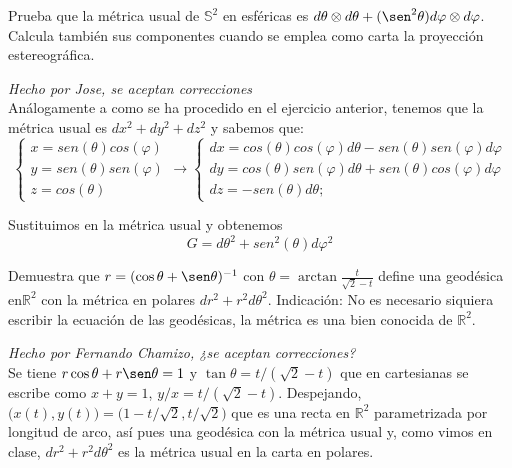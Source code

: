 \begin{problem}[9] Prueba que la métrica usual de $\mathbb{S}^2$ en esféricas es 
	$
	d\theta\otimes d\theta+(\sen^2\theta) d\varphi\otimes d\varphi
	$.
	Calcula también sus componentes cuando se emplea como carta la proyección estereográfica.
	
	
	\solution\textit{Hecho por Jose, se aceptan correcciones}\\ Análogamente a como se ha procedido en el ejercicio anterior, tenemos que la métrica usual es $dx^2+dy^2+dz^2$ y sabemos que: $$\begin{cases}x=sen(\theta)cos(\varphi)\\y=sen(\theta)sen(\varphi)\\z=cos(\theta)
	\end{cases}\longrightarrow\begin{cases}dx=cos(\theta)cos(\varphi)d\theta-sen(\theta)sen(\varphi)d\varphi\\dy=cos(\theta)sen(\varphi)d\theta+sen(\theta)cos(\varphi)d\varphi\\dz=-sen(\theta)d\theta;
	\end{cases}$$ 
	
	Sustituimos en la métrica usual y obtenemos $$G=d\theta^2+sen^2(\theta)d\varphi^2$$
\end{problem}
\begin{problem}[10] Demuestra que 
	$r=(\cos\theta+\sen\theta)^{-1}$ con $\theta=\arctan \frac{t}{\sqrt{2}-t}$ define una geodésica en$ℝ^2$ con la métrica en polares $dr^2+r^2d\theta^2$.
	{\sf Indicación:} No es necesario siquiera escribir la ecuación de las geodésicas, la métrica es una bien conocida de $ℝ^2$. 
	
	\solution\textit{Hecho por Fernando Chamizo, ¿se aceptan correcciones?}\\ Se tiene $r\cos\theta+r\sen\theta=1$ y $\tan\theta= {t}/({\sqrt{2}-t})$ que en cartesianas se escribe como $x+y=1$, ${y}/x={t}/({\sqrt{2}-t})$. Despejando, $\big(x(t),y(t)\big)=\big(1-t/\sqrt{2},t/\sqrt{2}\big)$ que es  una recta en $ℝ^2$ parametrizada por longitud de arco, así pues una geodésica con la métrica usual y, como vimos en clase, $dr^2+r^2d\theta^2$ es la métrica usual en la carta en polares. 
\end{problem}
